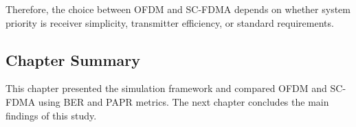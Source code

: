 Therefore, the choice between OFDM and SC-FDMA depends on whether system
priority is receiver simplicity, transmitter efficiency, or standard
requirements.

\subsection{Chapter Summary}

This chapter presented the simulation framework and compared OFDM and
SC-FDMA using BER and PAPR metrics. The next chapter concludes the main
findings of this study.